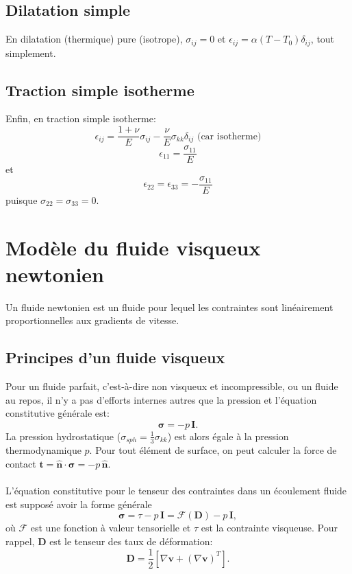 \subsection{Dilatation simple}
En dilatation (thermique) pure (isotrope), $\sigma_{ij}=0$ et $\epsilon_{ij}=\alpha(T-T_0)\delta_{ij}$, tout simplement.
\subsection{Traction simple isotherme}
Enfin, en traction simple isotherme:
$$\epsilon_{ij}=\frac{1+\nu}{E}\sigma_{ij}-\frac{\nu}{E}\sigma_{kk}\delta_{ij} \text{ (car isotherme)}$$
$$\epsilon_{11}=\frac{\sigma_{11}}{E}$$ et 
$$\epsilon_{22}=\epsilon_{33}=-\frac{\sigma_{11}}{E}$$ puisque $\sigma_{22}=\sigma_{33}=0.$

\section{Modèle du fluide visqueux newtonien}
Un fluide newtonien est un fluide pour lequel les contraintes sont linéairement proportionnelles aux gradients de vitesse.
\subsection{Principes d'un fluide visqueux}
Pour un fluide parfait, c'est-à-dire non visqueux et incompressible, ou un fluide au repos, il n'y a pas d'efforts internes autres que la pression et l'équation constitutive générale est:
$$\boldsymbol{\sigma}=-p\,\textbf{I}.$$ La pression hydrostatique ($\sigma_{sph}=\frac{1}{3}\sigma_{kk}$) est alors égale à la pression thermodynamique $p$. Pour tout élément de surface, on peut calculer la force de contact $\textbf{t}=\hat{\textbf{n}}\cdot\boldsymbol{\sigma}=-p\,\hat{\textbf{n}}$.
\paragraph{}
L'équation constitutive pour le tenseur des contraintes dans un écoulement fluide est supposé avoir la forme générale $$\boldsymbol{\sigma}=\tau-p\,\textbf{I}=\mathcal{F}(\textbf{D})-p\,\textbf{I},$$ où $\mathcal{F}$ est une fonction à valeur tensorielle et $\tau$ est la contrainte visqueuse. Pour rappel, \textbf{D} est le tenseur des taux de déformation:
$$\textbf{D}=\frac{1}{2}[\nabla\textbf{v}+(\nabla\textbf{v})^T].$$

